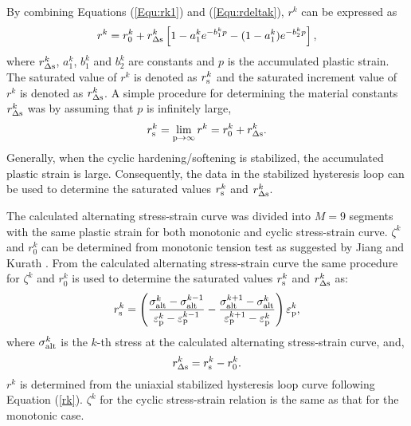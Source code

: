 By combining Equations (\ref{Equ:rk1}) and (\ref{Equ:rdeltak}), $r^k$ can be expressed as
\begin{equation}\label{rk}
{r^k} = r_0^k + r_{\Delta \rm{s}}^k\left[ {1 - a_1^k{e^{ - b_1^kp}} - (1-a_1^k){e^{ - b_2^kp}} }\right],
\end{equation}
where $r_{\Delta \rm{s}}^k$, $a_1^k$, $b_1^k$ and $b_2^k$ are constants and $p$ is the accumulated plastic strain.
The saturated value of $r^k$ is denoted as $r^k_{\rm{s}}$ and the saturated increment value of $r^k$ is denoted as $r^k_{\Delta \rm{s}}$.
A simple procedure for determining the material constants $r_{\Delta \rm{s}}^k$ was by assuming that $p$ is infinitely large,
\begin{equation}
r_{\rm{s}}^k=\mathop {\lim }\limits_{{\rm{p}} \to \infty } {r^k} = r_0^k + r_{\Delta \rm{s}}^k.
\label{Equ:rsk}
\end{equation}
Generally, when the cyclic hardening/softening is stabilized, the accumulated plastic strain is large.
Consequently, the data in the stabilized hysteresis loop can be used to determine the saturated values $r^k_{\rm{s}}$ and $r^k_{\Delta \rm{s}}$.

The calculated alternating stress-strain curve was divided into $M=9$ segments with the same plastic strain for both monotonic and cyclic stress-strain curve.  $\zeta^k$ and $r_0^k$ can be determined from monotonic tension test as suggested by Jiang and Kurath \cite{Jiang1996387}. From the calculated alternating stress-strain curve the same procedure for $\zeta^k$ and $r_0^k$ is used to determine the saturated values $r^k_{\rm{s}}$ and $r^k_{\Delta \rm{s}}$ as:
\begin{equation}
r_{\rm{s}}^k = \left( {\frac{{\sigma _{\rm{alt}}^k - \sigma _{\rm{alt}}^{k - 1}}}{{\varepsilon _{\rm{p}}^k - \varepsilon _{\rm{p}}^{k - 1}}} - \frac{{\sigma _{\rm{alt}}^{k + 1} - \sigma _{\rm{alt}}^k}}{{\varepsilon _{\rm{p}}^{k + 1} - \varepsilon _{\rm{p}}^k}}} \right)\varepsilon _{\rm{p}}^k,
\end{equation}
where $\sigma _{\rm{alt}}^k$ is the $k$-th stress at the calculated alternating stress-strain curve, and,
\begin{equation}
r_{\Delta \rm{s}}^k = r_{\rm{s}}^k - r_{0}^k.
\end{equation}
$r^k$ is determined from the uniaxial stabilized hysteresis loop curve following Equation (\ref{rk}). ${\zeta ^k}$ for the cyclic stress-strain relation is the same as that for the monotonic case.

